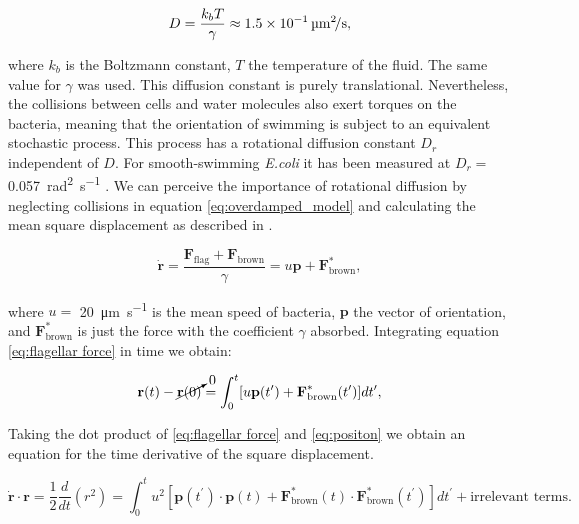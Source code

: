 \begin{equation}
	D = \frac{k_bT}{\gamma} \approx \SI[per-mode = symbol]{1.5d-1}{\square\micro\meter \per \second},
\end{equation}
 
where $k_b$ is the Boltzmann constant, $T$ the temperature of the fluid. The same value for $\gamma$ was used. This diffusion constant is purely translational. Nevertheless, the collisions between cells and water molecules also exert torques on the bacteria, meaning that the orientation of swimming is subject to an equivalent stochastic process. This process has a rotational diffusion constant $D_r$ independent of $D$. For smooth-swimming \textit{E.coli} it has been measured at $D_r=$ \SI[per-mode = symbol]{0.057}{\square\radian \per \second} \cite{Drescher2011FluidScattering}. We can perceive the importance of rotational diffusion by neglecting collisions in equation \eqref{eq:overdamped_model} and calculating the mean square displacement as described in \cite{Lauga2020TheMotility}.

\begin{equation} \label{eq:flagellar force}
	 \dot{\textbf{r}} =\frac{\textbf{F}_{\text{flag}} + \textbf{F}_{\text{brown}} }{\gamma} = u \textbf{p} + \textbf{F}^*_{\text{brown}},
\end{equation}

where $u=$ \SI[per-mode = symbol]{20}{\micro\meter \per \second} is the mean speed of bacteria, $\textbf{p}$ the vector of orientation, and $\textbf{F}^*_{\text{brown}}$ is just the force with the coefficient $\gamma$ absorbed. Integrating equation \eqref{eq:flagellar force} in time we obtain:

\begin{equation} \label{eq:positon}
	\textbf{r}(t) - \cancelto{0}{\textbf{r}(0)}  = \int_0^t [u \textbf{p}(t^\prime) +  \textbf{F}^*_{\text{brown}}(t^\prime)  ]dt^\prime ,
\end{equation}

Taking the dot product of \eqref{eq:flagellar force} and \eqref{eq:positon} we obtain an equation for the time derivative of the square displacement.

\begin{equation} \label{eq:derivative of msd}
	\dot{\textbf{r}} \cdot \textbf{r} = \frac{1}{2}\frac{d}{dt} (r^2) = \int_0^t u^2 [ \textbf{p}(t^\prime) \cdot \textbf{p}(t) + \textbf{F}^*_{\text{brown}}(t) \cdot \textbf{F}^*_{\text{brown}}(t^\prime)]dt^\prime + \text{irrelevant terms}.
\end{equation}


